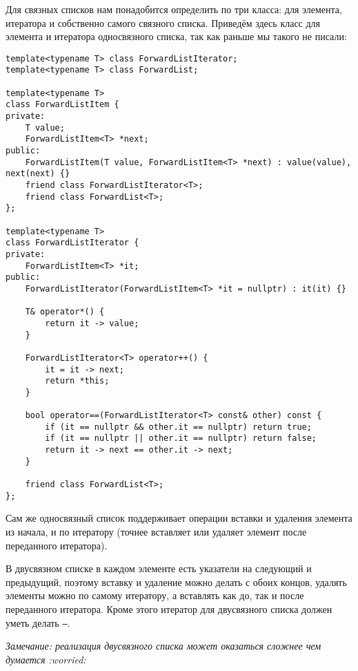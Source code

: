 Для связных списков нам понадобится определить по три класса: для элемента, итератора и собственно самого связного списка. Приведём здесь класс для элемента и итератора односвязного списка, так как раньше мы такого не писали:
\begin{verbatim}
template<typename T> class ForwardListIterator;
template<typename T> class ForwardList;

template<typename T>
class ForwardListItem {
private:
    T value;
    ForwardListItem<T> *next;
public:
    ForwardListItem(T value, ForwardListItem<T> *next) : value(value), next(next) {}
    friend class ForwardListIterator<T>;
    friend class ForwardList<T>;
};

template<typename T>
class ForwardListIterator {
private:
    ForwardListItem<T> *it;
public:
    ForwardListIterator(ForwardListItem<T> *it = nullptr) : it(it) {}

    T& operator*() {
        return it -> value;
    }

    ForwardListIterator<T> operator++() {
        it = it -> next;
        return *this;
    }

    bool operator==(ForwardListIterator<T> const& other) const {
        if (it == nullptr && other.it == nullptr) return true;
        if (it == nullptr || other.it == nullptr) return false;
        return it -> next == other.it -> next;
    }

    friend class ForwardList<T>;
};
\end{verbatim}
Сам же односвязный список поддерживает операции вставки и удаления элемента из начала, и по итератору (точнее вставляет или удаляет элемент после переданного итератора).

В двусвязном списке в каждом элементе есть указатели на следующий и предыдущий, поэтому вставку и удаление можно делать с обоих концов, удалять элементы можно по самому итератору, а вставлять как до, так и после переданного итератора. Кроме этого итератор для двусвязного списка должен уметь делать \texttt{--}.

\textit{Замечание: реализация двусвязного списка может оказаться сложнее чем думается :worried:}
